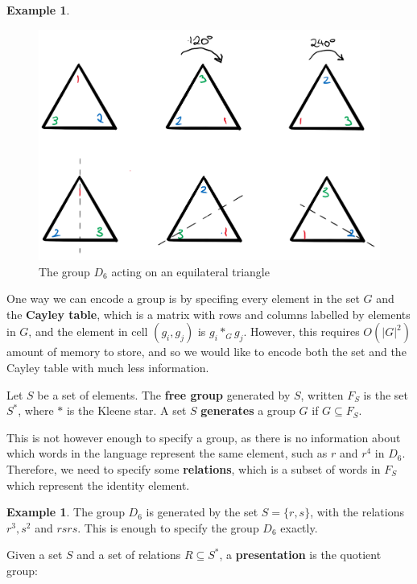 \documentclass[10pt]{article}
\theoremstyle{plain}
\theoremstyle{definition}
\newtheorem{example}[theorem]{Example}
\theoremstyle{definition}
\theoremstyle{definition}
\begin{document}
\begin{multicols}{2}
\begin{example}
	\begin{figure}[H]
		\centering
		\includegraphics[scale = 0.15]{D6}
		\caption{The group $D_6$ acting on an equilateral triangle}
	\end{figure}
\end{example}

One way we can encode a group is by specifing every element in the set $G$ and the \textbf{Cayley table}, which is a matrix with rows and columns labelled by elements in $G$, and the element in cell $(g_i, g_j)$ is $g_i *_G g_j$. However, this requires $O(|G|^2)$ amount of memory to store, and so we would like to encode both the set and the Cayley table with much less information.

Let $S$ be a set of elements. The \textbf{free group} generated by $S$, written $F_S$ is the set $S^*$, where $*$ is the Kleene star. A set $S$ \textbf{generates} a group $G$ if $G \subseteq F_S$.

This is not however enough to specify a group, as there is no information about which words in the language represent the same element, such as $r$ and $r^4$ in $D_6$. Therefore, we need to specify some \textbf{relations}, which is a subset of words in $F_S$ which represent the identity element.

\begin{example}
	The group $D_6$ is generated by the set $S= \{ r, s \}$, with the relations $r^3, s^2$ and $rsrs$. This is enough to specify the group $D_6$ exactly.
\end{example}

Given a set $S$ and a set of relations $R \subseteq S^*$, a \textbf{presentation} is the quotient group:


\end{multicols}
\end{document}
